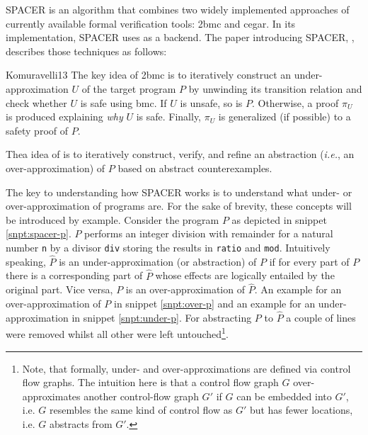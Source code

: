 SPACER \cite{Komuravelli13} is an algorithm that combines two widely implemented approaches of currently available formal verification tools: \gls{2bmc} and \gls{cegar}.
In its implementation, SPACER uses \muZ{} as a backend.
The paper introducing SPACER,  \cite{Komuravelli13}, describes those techniques as follows:
\begin{displaycquote}[p.1f]{Komuravelli13}
    The key idea of \gls{2bmc} is to iteratively construct an under-approximation  $ U $ of the target program $ P $ by unwinding its transition relation and check whether $ U $ is safe using \gls{bmc}.
    If $ U $ is unsafe, so is $ P $.
    Otherwise, a proof $ \pi_U $ is produced explaining \textit{why} $ U $ is safe.
    Finally, $ \pi_U $ is generalized (if possible) to a safety proof of $ P $.
    \textelp{}

    Thea idea of  is to iteratively construct, verify, and refine an abstraction (\textit{i.e.}, an over-approximation) of $ P $ based on abstract counterexamples.
\end{displaycquote}

The key to understanding how SPACER works is to understand what under- or over-approximation of programs are.
For the sake of brevity, these concepts will be introduced by example.
Consider the program $ P $ as depicted in snippet \ref{snpt:spacer-p}.
$ P $ performs an integer division with remainder for a natural number \lstinline{n} by a divisor \lstinline{div} storing the results in \lstinline{ratio} and \lstinline{mod}.
Intuitively speaking, $ \hat{P} $ is an under-approximation (or abstraction) of $ P $ if for every part of $ P $ there is a corresponding part of $ \hat{P} $ whose effects are logically entailed by the original part.
Vice versa, $ P $ is an over-approximation of $ \hat{P} $.
An example for an over-approximation of $ P $ in snippet \ref{snpt:over-p} and an example for an under-approximation in snippet \ref{snpt:under-p}.
For abstracting $ P $ to $ \hat{P} $ a couple of lines were removed whilst all other were left untouched\footnote{%
    Note, that formally, under- and over-approximations are defined via control flow graphs.
    The intuition here is that a control flow graph $ G $ over-approximates another control-flow graph $ G' $ if $ G $ can be embedded into $ G' $, i.e. $ G $ resembles the same kind of control flow as $ G' $ but has fewer locations, i.e. $ G $ abstracts from $ G' $.
}.

